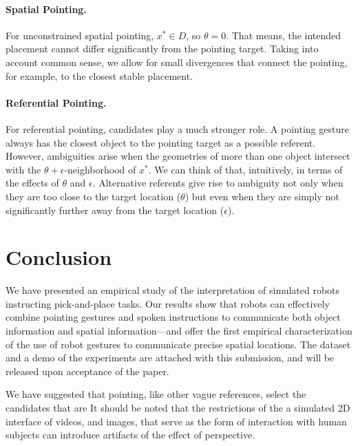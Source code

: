 \paragraph{Spatial Pointing.}  For unconstrained spatial pointing, $x^* \in D$, so $\theta=0$.  That means, the intended placement cannot differ significantly from the pointing target.  Taking into account common sense, we allow for small divergences that connect the pointing, for example, to the closest stable placement.

\paragraph{Referential Pointing.}  For referential pointing, candidates play a much stronger role.  A pointing gesture always has the closest object to the pointing target as a possible referent.  However, ambiguities arise when the geometries of more than one object intersect with the $\theta+\epsilon$-neighborhood of $x^*$.   We can think of that, intuitively, in terms of the effects of $\theta$ and $\epsilon$.  Alternative referents give rise to ambiguity not only when they are too close to the target location ($\theta$) but even when they are simply not significantly further away from the target location ($\epsilon$).  

\section{Conclusion}
\label{conclusion}

We have presented an empirical study of the interpretation of simulated robots instructing pick-and-place tasks.  Our results show that robots can effectively combine pointing gestures and spoken instructions to communicate both object information and spatial information---and offer the first empirical characterization of the use of robot gestures to communicate precise spatial locations.  The dataset and a demo of the experiments are attached with this submission, and will be released upon acceptance of the paper.

We have suggested that pointing, like other vague references, select the candidates that are 
It should be noted that the restrictions of the a simulated 2D interface of videos, and images, that serve as the form of interaction with human subjects can introduce artifacts of the effect of perspective.  
